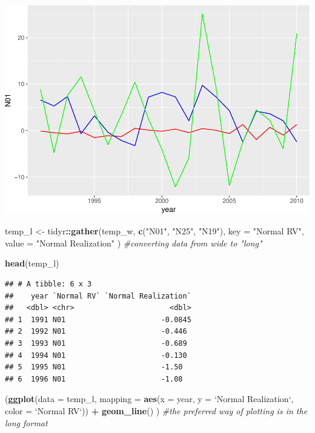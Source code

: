 \documentclass[]{article}
\newenvironment{Shaded}{\begin{snugshade}}{\end{snugshade}}
\newcommand{\KeywordTok}[1]{\textcolor[rgb]{0.13,0.29,0.53}{\textbf{#1}}}
\newcommand{\DataTypeTok}[1]{\textcolor[rgb]{0.13,0.29,0.53}{#1}}
\newcommand{\StringTok}[1]{\textcolor[rgb]{0.31,0.60,0.02}{#1}}
\newcommand{\CommentTok}[1]{\textcolor[rgb]{0.56,0.35,0.01}{\textit{#1}}}
\newcommand{\OperatorTok}[1]{\textcolor[rgb]{0.81,0.36,0.00}{\textbf{#1}}}
\newcommand{\NormalTok}[1]{#1}
\begin{document}
\includegraphics{Intro_graphics_files/figure-latex/wide_vs_long-1.pdf}

\begin{Shaded}
\begin{Highlighting}[]
\NormalTok{temp_l <-}\StringTok{ }\NormalTok{tidyr}\OperatorTok{::}\KeywordTok{gather}\NormalTok{(temp_w, }\KeywordTok{c}\NormalTok{(}\StringTok{"N01"}\NormalTok{, }\StringTok{"N25"}\NormalTok{, }\StringTok{"N19"}\NormalTok{), }
                        \DataTypeTok{key =} \StringTok{"Normal RV"}\NormalTok{, }
                        \DataTypeTok{value =} \StringTok{"Normal Realization"}
\NormalTok{                        ) }\CommentTok{#converting data from wide to "long"}

\KeywordTok{head}\NormalTok{(temp_l)}
\end{Highlighting}
\end{Shaded}

\begin{verbatim}
## # A tibble: 6 x 3
##    year `Normal RV` `Normal Realization`
##   <dbl> <chr>                      <dbl>
## 1  1991 N01                      -0.0845
## 2  1992 N01                      -0.446 
## 3  1993 N01                      -0.689 
## 4  1994 N01                      -0.130 
## 5  1995 N01                      -1.50  
## 6  1996 N01                      -1.08
\end{verbatim}

\begin{Shaded}
\begin{Highlighting}[]
\NormalTok{(}\KeywordTok{ggplot}\NormalTok{(}\DataTypeTok{data =}\NormalTok{ temp_l,}
        \DataTypeTok{mapping =} \KeywordTok{aes}\NormalTok{(}\DataTypeTok{x =}\NormalTok{ year, }
                      \DataTypeTok{y =} \StringTok{`}\DataTypeTok{Normal Realization}\StringTok{`}\NormalTok{,}
                      \DataTypeTok{color =} \StringTok{`}\DataTypeTok{Normal RV}\StringTok{`}\NormalTok{)) }\OperatorTok{+}
\StringTok{    }\KeywordTok{geom_line}\NormalTok{()}
\NormalTok{  ) }\CommentTok{#the preferred way of plotting is in the long format}
\end{Highlighting}
\end{Shaded}
\end{document}

